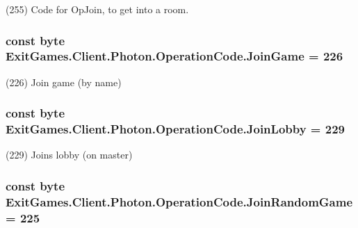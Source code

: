 (255) Code for Op\+Join, to get into a room.

\subsubsection[{\texorpdfstring{Join\+Game}{JoinGame}}]{\setlength{\rightskip}{0pt plus 5cm}const byte Exit\+Games.\+Client.\+Photon.\+Operation\+Code.\+Join\+Game = 226}\hypertarget{class_exit_games_1_1_client_1_1_photon_1_1_operation_code_a98972f7fc4a8965ef0597387b298bba2}{}\label{class_exit_games_1_1_client_1_1_photon_1_1_operation_code_a98972f7fc4a8965ef0597387b298bba2}


(226) Join game (by name)

\subsubsection[{\texorpdfstring{Join\+Lobby}{JoinLobby}}]{\setlength{\rightskip}{0pt plus 5cm}const byte Exit\+Games.\+Client.\+Photon.\+Operation\+Code.\+Join\+Lobby = 229}\hypertarget{class_exit_games_1_1_client_1_1_photon_1_1_operation_code_a160904b6b125f48aeee0a33f7745aa6b}{}\label{class_exit_games_1_1_client_1_1_photon_1_1_operation_code_a160904b6b125f48aeee0a33f7745aa6b}


(229) Joins lobby (on master)

\subsubsection[{\texorpdfstring{Join\+Random\+Game}{JoinRandomGame}}]{\setlength{\rightskip}{0pt plus 5cm}const byte Exit\+Games.\+Client.\+Photon.\+Operation\+Code.\+Join\+Random\+Game = 225}\hypertarget{class_exit_games_1_1_client_1_1_photon_1_1_operation_code_a43219f5aad29ff41925811ef959dd442}{}\label{class_exit_games_1_1_client_1_1_photon_1_1_operation_code_a43219f5aad29ff41925811ef959dd442}


